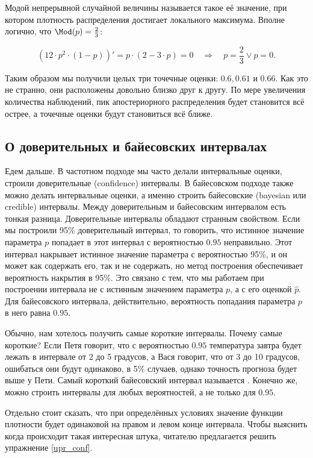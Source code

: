 Модой непрерывной случайной величины называется такое её значение, при котором плотность распределения достигает локального максимума. Вполне логично, что $\Mod(p) = \frac{2}{3}$:

\[ (12 \cdot p^2 \cdot (1-p) )' = p \cdot (2 - 3 \cdot p) = 0 \quad \Rightarrow \quad p = \frac{2}{3} \vee p = 0.\]

Таким образом мы получили целых три точечные оценки: $0.6, 0.61$ и $0.66$. Как это не странно, они расположены довольно близко друг к другу. По мере увеличения количества наблюдений, пик апостериорного распределения будет становится всё острее, а точечные оценки будут становиться всё ближе.

\subsection*{О доверительных и байесовских интервалах}

Едем дальше. В частотном подходе мы часто делали интервальные оценки, строили доверительные (confidence) интервалы. В байесовском подходе также можно делать интервальные оценки, а именно строить байесовские (bayesian или credible) интервалы. Между доверительным и байесовским интервалом есть тонкая разница. Доверительные интервалы обладают странным свойством. Если мы построили 95\% доверительный интервал, то говорить, что истинное значение параметра $p$ попадает в этот интервал с вероятностью $0.95$ неправильно. Этот интервал накрывает истинное значение параметра с вероятностью 95\%, и он может как содержать его, так и не содержать, но метод построения обеспечивает вероятность накрытия в 95\%. Это связано с тем, что мы работаем при построении интервала не с истинным значением параметра $p$, а с его оценкой $\hat p$. Для байесовского интервала, действительно, вероятность попадания параметра $p$ в него равна $0.95$.

Обычно, нам хотелось получить самые короткие интервалы. Почему самые короткие? Если Петя говорит, что с вероятностью $0.95$ температура завтра будет лежать в интервале от 2 до 5 градусов, а Вася говорит, что от 3 до 10 градусов, ошибаться они будут одинаково, в 5\% случаев, однако точность прогноза будет выше у Пети. Самый короткий байесовский интервал называется . Конечно же, можно строить интервалы для любых вероятностей, а не только для $0.95$. 

Отдельно стоит сказать, что при определённых условиях значение функции плотности будет одинаковой на правом и левом конце интервала. Чтобы выяснить когда происходит такая интересная штука, читателю предлагается решить упражнение \ref{upr_conf}.

